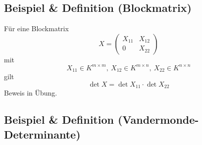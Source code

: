 \subsection{Beispiel \& Definition (Blockmatrix)}
	\begin{Definition}[Blockmatrix]
		Für eine Blockmatrix
			\[ X = \begin{pmatrix}
			X_{11} & X_{12}\\ 0 & X_{22}
			\end{pmatrix}\]
		mit
			\[ X_{11}\in K^{m\times m},\ X_{12}\in K^{m\times n},\ X_{22}\in K^{n\times n} \]
		gilt
			\[ \det X = \det X_{11} \cdot \det X_{22} \]
		Beweis in Übung.
	\end{Definition}
\subsection{Beispiel \& Definition (Vandermonde-Determinante)}
